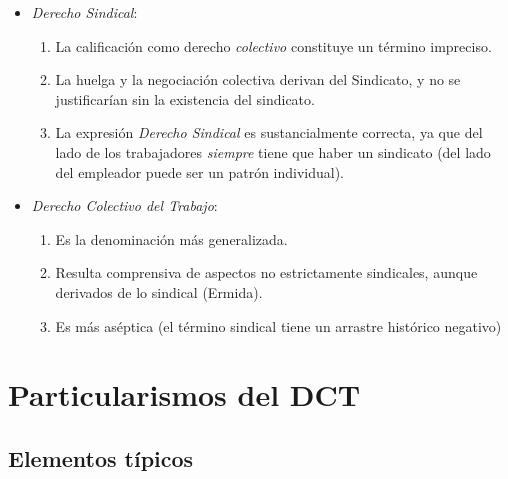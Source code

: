 \documentclass[spanish,12pt,a4paper,titlepage]{report}
\begin{document}
\begin{itemize}
\item \textit{Derecho Sindical}:
  \begin{enumerate}
  \item La calificación como derecho \textit{colectivo} constituye un término impreciso.
  \item La huelga y la negociación colectiva derivan del Sindicato, y no se justificarían sin la existencia del sindicato.
  \item La expresión \textit{Derecho Sindical} es sustancialmente correcta, ya que del lado de los trabajadores \textit{siempre} tiene que haber un sindicato (del lado del empleador puede ser un patrón individual).
  \end{enumerate}
\item \textit{Derecho Colectivo del Trabajo}:
  \begin{enumerate}
  \item Es la denominación más generalizada.
  \item Resulta  comprensiva de aspectos no estrictamente sindicales, aunque derivados de lo sindical (Ermida).
  \item Es más aséptica (el término sindical tiene un arrastre histórico negativo)
  \end{enumerate}
\end{itemize}

\section{Particularismos del DCT}
\label{sec:particularismos-del-dct}

\subsection{Elementos típicos}
\label{sec:elementos-tipicos}
\end{document}

